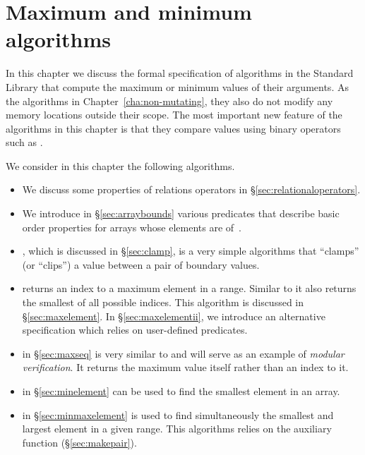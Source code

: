 
\chapter{Maximum and minimum algorithms}

In this chapter we discuss the formal specification of algorithms
in the \cxx Standard Library \cite[\S 28.7.8]{cxx-17-draft}
that compute the maximum or minimum values of their arguments.
As the algorithms in Chapter~\ref{cha:non-mutating}, they also do not modify
any memory locations outside their scope.
The most important new feature of the algorithms in this chapter
is that they compare values using binary operators such as \inl{<}.

We consider in this chapter the following algorithms.

\begin{itemize}

\item
We discuss some properties of relations operators in \S\ref{sec:relationaloperators}.

\item
We introduce in \S\ref{sec:arraybounds} various predicates
that describe basic order properties for arrays whose elements are of~.

\item
\clamp, which is discussed in \S\ref{sec:clamp},
is a very simple algorithms that ``clamps'' (or ``clips'') a value between a
pair of boundary values.
  
\item \maxelement  
returns an index to
a maximum element in a range. Similar to \find it also
returns the smallest of all possible indices.
This algorithm is discussed in \S\ref{sec:maxelement}.
In \S\ref{sec:maxelementii}, we introduce an alternative
specification \maxelementii which relies on user-defined predicates.

\item \maxseq  in \S\ref{sec:maxseq}
is very similar to \maxelement and will serve as an
example of \emph{modular verification}.
It returns the maximum value itself rather than an index to
it.

\item \minelement in \S\ref{sec:minelement}
can be used to find the smallest element in an array.

\item \minmaxelement in \S\ref{sec:minmaxelement}
is used to find simultaneously the smallest and largest element in a given range.
This algorithms relies on the auxiliary function
\makepair (\S\ref{sec:makepair}).
\end{itemize}

